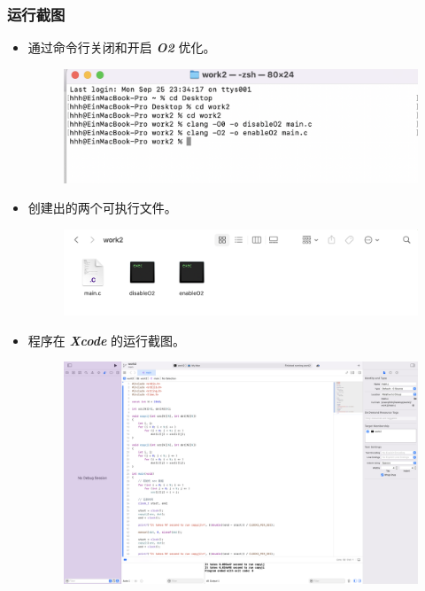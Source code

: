         \subsubsection{运行截图}
            \begin{itemize}
                \item 通过命令行关闭和开启 \textbf{\textit{O2}} 优化。
                \begin{figure}[htbp]
                    \centering
                    \includegraphics*[width = 13cm]{work2_s5.png}
                \end{figure}
                \item 创建出的两个可执行文件。
                \begin{figure}[htbp]
                    \centering
                    \includegraphics*[width = 13cm]{work2_s6.png}
                \end{figure}
                \item 程序在 \textbf{\textit{Xcode}} 的运行截图。
                \begin{figure}[htbp]
                    \centering
                    \includegraphics*[width = 14cm]{work2_s7.png}

\end{figure}
\end{itemize}
